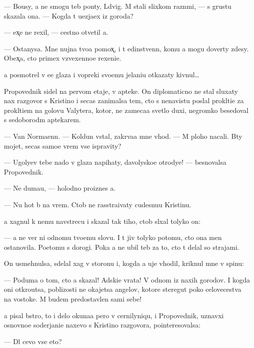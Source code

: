 \documentclass[10pt]{book}
\begin{document}
— Bo{\y}usy, {\y}a ne smogu teb{\ia} pon{\ia}ty, L{\iu}dvig. M{\yi} stali slixkom razn{\yi}mi, — s grust{\y}u skazala ona. — Kogda t{\yi} u{\y}ezja{\y}ex iz goroda?

— {\Y}ex̨e ne rexil, — cestno otvetil {\y}a.

— Ostanysa. Mne nujna tvo{\y}a pomox̨, i t{\yi} {\y}edinstvenn{\yi}{\y}, komu {\y}a mogu dover{\ia}ty zdesy. Obex̨a{\y}, cto primex vzvexenno{\y}e rexeni{\y}e.

{\Y}a posmotrel v {\y}e{\y}e glaza i vopreki svo{\y}emu jelani{\y}u otkazaty kivnul…

Propovednik sidel na pervom etaje, v apteke. On diplomaticno ne stal sluxaty nax razgovor s Kristino{\y} i se{\y}cas zanimalsa tem, cto s nenavist{\y}u pos{\yi}lal prokl{\ia}ti{\y}e za prokl{\ia}ti{\y}em na golovu Valytera, kotor{\yi}{\y}, ne zameca{\y}a svetlo{\y} duxi, negromko besedoval s sedoborod{\yi}m aptekarem.

— Van Norma{\y}enn. — Koldun vstal, zakr{\yi}va{\y}a mne v{\yi}hod. — M{\yi} ploho nacali. B{\yi}ty mojet, se{\y}cas samo{\y}e vrem{\ia} vse ispravity?

— Ugolyev tebe nado v glaza napihaty, d{\y}avolysko{\y}e otrodye! — besnovalsa Propovednik.

— Ne duma{\y}u, — holodno pro{\y}iznes {\y}a.

— Nu hot{\ia} b{\yi} na vrem{\ia}. Ctob{\yi} ne rasstra{\y}ivaty cudesnu{\y}u Kristinu.

{\Y}a xagnul k nemu navstrecu i skazal tak tiho, ctob{\yi} sl{\yi}xal tolyko on:

— {\Y}a ne ver{\iu} ni odnomu tvo{\y}emu slovu. I t{\yi} jiv tolyko potomu, cto ona men{\ia} ostanovila. Poetomu s dorogi. Poka {\y}a ne ubil teb{\ia} za to, cto t{\yi} delal so strajami.

On usmehnulsa, sdelal xag v storonu i, kogda {\y}a uje v{\yi}hodil, kriknul mne v spinu:

— Poduma{\y} o tom, cto {\y}a skazal! Adski{\y}e vrata! V odnom iz naxih gorodov. I kogda oni otkro{\y}utsa, poblizosti ne okajetsa angelov, kotor{\yi}{\y}e steregut poko{\y} celovecestva na vostoke. M{\yi} budem predostavlen{\yi} sami sebe!



{\Y}a pisal b{\yi}stro, to i delo okuna{\y}a pero v cernilyniqu, i Propovednik, uznavxi{\y} osnovno{\y}e soderjani{\y}e naxevo s Kristino{\y} razgovora, po{\y}interesovalsa:

— Dl{\ia} cevo vse eto?
\end{document}
